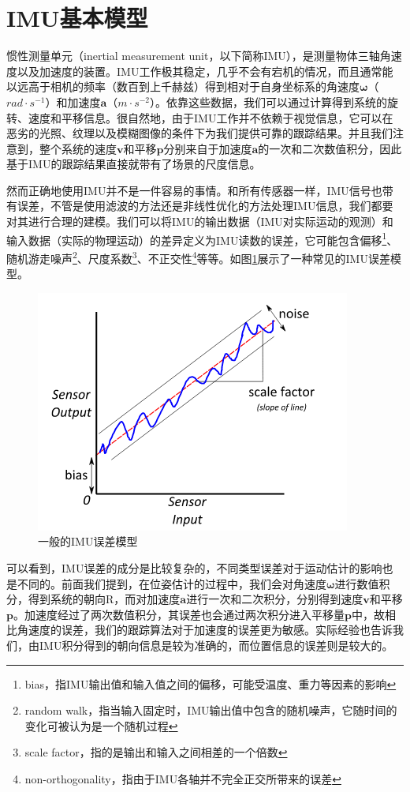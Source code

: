 \section{IMU基本模型}

惯性测量单元（inertial measurement unit，以下简称IMU），是测量物体三轴角速度以及加速度的装置。IMU工作极其稳定，几乎不会有宕机的情况，而且通常能以远高于相机的频率（数百到上千赫兹）得到相对于自身坐标系的角速度$\bm\omega$（$rad \cdot s^{-1}$）和加速度$\mathbf{a}$（$m \cdot s^{-2}$）。依靠这些数据，我们可以通过计算得到系统的旋转、速度和平移信息。很自然地，由于IMU工作并不依赖于视觉信息，它可以在恶劣的光照、纹理以及模糊图像的条件下为我们提供可靠的跟踪结果。并且我们注意到，整个系统的速度$\mathbf{v}$和平移$\mathbf{p}$分别来自于加速度$\mathbf{a}$的一次和二次数值积分，因此基于IMU的跟踪结果直接就带有了场景的尺度信息。

然而正确地使用IMU并不是一件容易的事情。和所有传感器一样，IMU信号也带有误差，不管是使用滤波的方法还是非线性优化的方法处理IMU信息，我们都要对其进行合理的建模。我们可以将IMU的输出数据（IMU对实际运动的观测）和输入数据（实际的物理运动）的差异定义为IMU读数的误差，它可能包含偏移\footnote{bias，指IMU输出值和输入值之间的偏移，可能受温度、重力等因素的影响}、随机游走噪声\footnote{random walk，指当输入固定时，IMU输出值中包含的随机噪声，它随时间的变化可被认为是一个随机过程}、尺度系数\footnote{scale factor，指的是输出和输入之间相差的一个倍数}、不正交性\footnote{non-orthogonality，指由于IMU各轴并不完全正交所带来的误差}等等\citep{imu2014}。如图\ref{fig:common_imu_errors}展示了一种常见的IMU误差模型。

\begin{figure}[htb!]
    \centering
    \includegraphics[width=.4\textwidth]{./figs/common_imu_errors.png}
    \caption{一般的IMU误差模型\citep{imu2014}}
    \label{fig:common_imu_errors}
\end{figure}

可以看到，IMU误差的成分是比较复杂的，不同类型误差对于运动估计的影响也是不同的。前面我们提到，在位姿估计的过程中，我们会对角速度$\bm\omega$进行数值积分，得到系统的朝向$\mathrm{R}$，而对加速度$\mathbf{a}$进行一次和二次积分，分别得到速度$\mathbf{v}$和平移$\mathbf{p}$。加速度经过了两次数值积分，其误差也会通过两次积分进入平移量$\mathbf{p}$中，故相比角速度的误差，我们的跟踪算法对于加速度的误差更为敏感。实际经验也告诉我们，由IMU积分得到的朝向信息是较为准确的，而位置信息的误差则是较大的。

